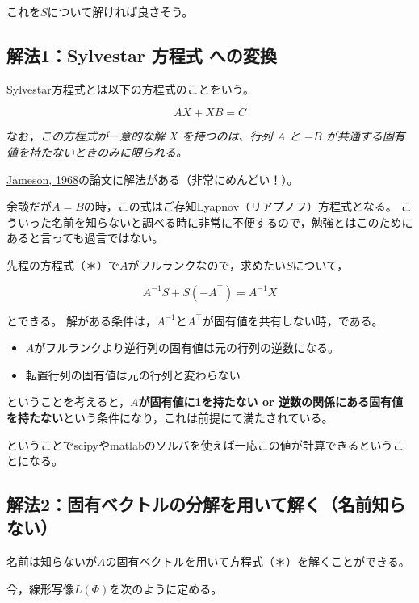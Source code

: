 \documentclass[11pt]{jsarticle}
\providecommand{\tightlist}{%
      \setlength{\itemsep}{0pt}\setlength{\parskip}{0pt}}
\begin{document}
これを\(S\)について解ければ良さそう。

    \subsection{解法1：Sylvestar 方程式
への変換}\label{ux89e3ux6cd51sylvestar-ux65b9ux7a0bux5f0f-ux3078ux306eux5909ux63db}

Sylvestar方程式とは以下の方程式のことをいう。

\[
AX + XB = C
\]

なお，\emph{この方程式が一意的な解 \(X\) を持つのは、行列 \(A\) と
\(−B\) が共通する固有値を持たないときのみに限られる。}

\href{http://aero-comlab.stanford.edu/Papers/jameson_007.pdf}{Jameson,
1968}の論文に解法がある（非常にめんどい！）。

余談だが\(A=B\)の時，この式はご存知Lyapnov（リアプノフ）方程式となる。
こういった名前を知らないと調べる時に非常に不便するので，勉強とはこのためにあると言っても過言ではない。

先程の方程式（＊）で\(A\)がフルランクなので，求めたい\(S\)について，

\[
A^{-1}S + S(-A^\top) = A^{-1}X
\]

とできる。
解がある条件は，\(A^{-1}\)と\(A^\top\)が固有値を共有しない時，である。

\begin{itemize}
\tightlist
\item
  \(A\)がフルランクより逆行列の固有値は元の行列の逆数になる。
\item
  転置行列の固有値は元の行列と変わらない
\end{itemize}

ということを考えると，\textbf{\(A\)が固有値に1を持たない or
逆数の関係にある固有値を持たない}という条件になり，これは前提にて満たされている。

ということでscipyやmatlabのソルバを使えば一応この値が計算できるということになる。

    \subsection{解法2：固有ベクトルの分解を用いて解く（名前知らない）}\label{ux89e3ux6cd52ux56faux6709ux30d9ux30afux30c8ux30ebux306eux5206ux89e3ux3092ux7528ux3044ux3066ux89e3ux304fux540dux524dux77e5ux3089ux306aux3044}

名前は知らないが\(A\)の固有ベクトルを用いて方程式（＊）を解くことができる。

今，線形写像\(L(\Phi)\)を次のように定める。
\end{document}
